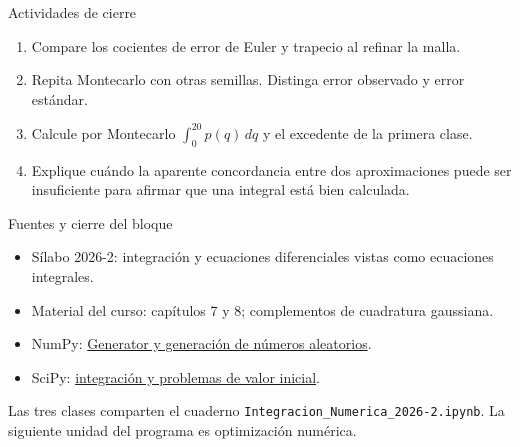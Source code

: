\documentclass[aspectratio=169,12pt]{beamer}
\begin{document}
\begin{frame}{Actividades de cierre}
\begin{enumerate}
\item Compare los cocientes de error de Euler y trapecio al refinar la malla.
\item Repita Montecarlo con otras semillas. Distinga error observado y error estándar.
\item Calcule por Montecarlo $\int_0^{20}p(q)\,dq$ y el excedente de la primera clase.
\item Explique cuándo la aparente concordancia entre dos aproximaciones
puede ser insuficiente para afirmar que una integral está bien calculada.
\end{enumerate}
\end{frame}

\begin{frame}{Fuentes y cierre del bloque}
\small
\begin{itemize}
\item Sílabo 2026-2: integración y ecuaciones diferenciales vistas como ecuaciones integrales.
\item Material del curso: capítulos 7 y 8; complementos de cuadratura gaussiana.
\item NumPy: \href{https://numpy.org/doc/stable/reference/random/generator.html}{Generator y generación de números aleatorios}.
\item SciPy: \href{https://docs.scipy.org/doc/scipy/reference/integrate.html}{integración y problemas de valor inicial}.
\end{itemize}
Las tres clases comparten el cuaderno \texttt{Integracion\_Numerica\_2026-2.ipynb}.
La siguiente unidad del programa es optimización numérica.
\end{frame}
\end{document}
